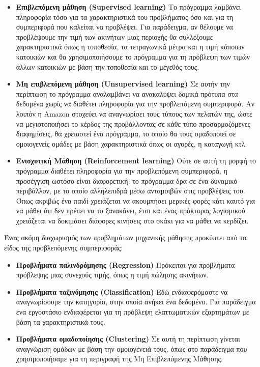 \begin{itemize}
	\item \textbf{Επιβλεπόμενη μάθηση (Supervised learning)} Το πρόγραμμα λαμβάνει πληροφορία τόσο για τα χαρακτηριστικά του προβλήματος όσο και για τη συμπεριφορά που καλείται να προβλέψει. Για παράδειγμα, αν θέλουμε να προβλέψουμε την τιμή των ακινήτων μιας περιοχής θα συλλέξουμε χαρακτηριστικά όπως η τοποθεσία, τα τετραγωνικά μέτρα και η τιμή κάποιων κατοικιών και θα χρησιμοποιήσουμε το πρόγραμμα για τη πρόβλεψη των τιμών άλλων κατοικιών με βάση την τοποθεσία και το μέγεθός τους.
	\item \textbf{Μη επιβλεπόμενη μάθηση (Unsupervised learning)} Σε αυτήν την περίπτωση το πρόγραμμα αναλαμβάνει να ανακαλύψει δομικά πρότυπα στα δεδομένα χωρίς να διαθέτει πληροφορία για την προβλεπόμενη συμπεριφορά. Αν λοιπόν η Amazon στοχεύει να αναγνωρίσει τους τύπους των πελατών της, ώστε να μεγιστοποιήσει το κέρδος της προβάλλοντας σε κάθε τύπο προσαρμοζόμενες διαφημίσεις, θα χρειαστεί ένα πρόγραμμα, το οποίο θα τους ομαδοποιεί σε ομοιογενείς ομάδες με βάση χαρακτηριστικά όπως οι αγορές, η καταγωγή κτλ.
	\item \textbf{Ενισχυτική Μάθηση (Reinforcement learning)} Ούτε σε αυτή τη μορφή το πρόγραμμα διαθέτει πληροφορία για την προβλεπόμενη συμπεριφορά, η προσέγγιση ωστόσο είναι διαφορετική: το πρόγραμμα δρα σε ένα δυναμικό περιβάλλον, με το οποίο αλληλεπιδρά μέσω ανταμοιβών στις προβλέψεις του. Όπως ακριβώς ένα παιδί χρειάζεται να ακουμπήσει μερικές φορές κάτι καυτό για να μάθει ότι δεν πρέπει να το ξανακάνει, έτσι και ένας πράκτορας λογισμικού χρειάζεται να δοκιμάσει διάφορες κινήσεις στο σκάκι για να μάθει να κερδίζει.
\end{itemize}

Ένας ακόμη διαχωρισμός των προβλημάτων μηχανικής μάθησης προκύπτει από το είδος της προβλεπόμενης συμπεριφοράς:

\begin{itemize}
	\item \textbf{Προβλήματα παλινδρόμησης (Regression)} Πρόκειται για προβλήματα πρόβλεψης μιας συνεχούς τιμής, όπως η τιμή πώλησης ακινήτων.
	\item \textbf{Προβλήματα ταξινόμησης (Classification)} Εδώ ενδιαφερόμαστε να αναγνωρίσουμε την κατηγορία, στην οποία ανήκει ένα δεδομένο. Για παράδειγμα ένα εργοστάσιο ενδιαφέρεται για τη πρόβλεψη ελαττωματικών εξαρτημάτων με βάση τα χαρακτηριστικά τους.
	\item \textbf{Προβλήματα ομαδοποίησης (Clustering)} Σε αυτή τη περίπτωση γίνεται αναγνώριση ομάδων με βάση την ομοιογένειά τους, όπως στο παράδειγμα που χρησιμοποιήσαμε για τη περιγραφή της Μη Επιβλεπόμενης Μάθησης.
\end{itemize}

